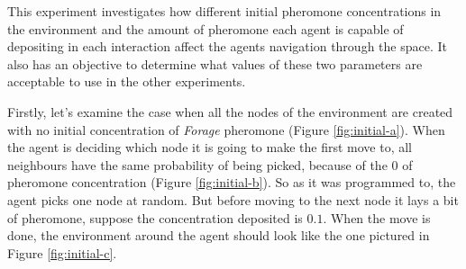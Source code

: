 This experiment investigates how different initial pheromone concentrations in the environment and the amount of pheromone each agent is capable of depositing in each interaction affect the agents navigation through the space. It also has an objective to determine what values of these two parameters are acceptable to use in the other experiments.

Firstly, let's examine the case when all the nodes of the environment are created with no initial concentration of \emph{Forage} pheromone (Figure \ref{fig:initial-a}). When the agent is deciding which node it is going to make the first move to, all neighbours have the same probability of being picked, because of the $0$ of pheromone concentration (Figure \ref{fig:initial-b}). So as it was programmed to, the agent picks one node at random. But before moving to the next node it lays a bit of pheromone, suppose the concentration deposited is $0.1$. When the move is done, the environment around the agent should look like the one pictured in Figure \ref{fig:initial-c}.

